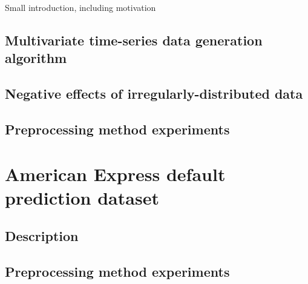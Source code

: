 \documentclass{statsmsc}
\begin{document}
Small introduction, including motivation

\subsection{Multivariate time-series data generation algorithm}%
\label{sub:Multivariate time-series data generation algorithm}




\subsection{Negative effects of irregularly-distributed data}%
\label{sub:Negative effects of irregularly-distributed data}



\subsection{Preprocessing method experiments}%
\label{sub:Preprocessing method experiments}




\section{American Express default prediction dataset}%
\label{sec:American Express default prediction dataset}%

\subsection{Description}%
\label{sub:Description}


\subsection{Preprocessing method experiments}%
\label{sub:Preprocessing method experiments}




\end{document}
